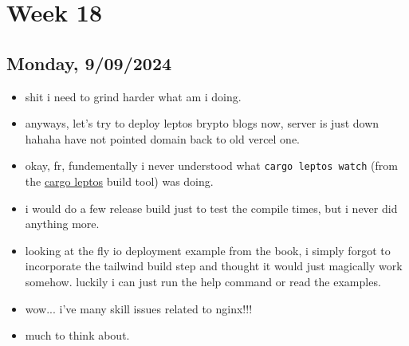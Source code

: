 \newpage
\section{Week 18}

\subsection*{Monday, 9/09/2024}
\begin{itemize}
    \item shit i need to grind harder what am i doing.
    \item anyways, let's try to deploy leptos brypto blogs now, server is just
        down hahaha have not pointed domain back to old vercel one.
    \item okay, fr, fundementally i never understood what \texttt{cargo leptos
        watch} (from the  
        \textcolor{blue}{\href{https://github.com/leptos-rs/cargo-leptos}{cargo leptos}}
        build tool) was doing.
    \item i would do a few release build just to test the compile times, but i
        never did anything more.
    \item looking at the fly io deployment example from the book, i simply
        forgot to incorporate the tailwind build step and thought it would just
        magically work somehow. luckily i can just run the help command or read
        the examples.
    \item wow... i've many skill issues related to nginx!!!
    \item much to think about.
\end{itemize}
